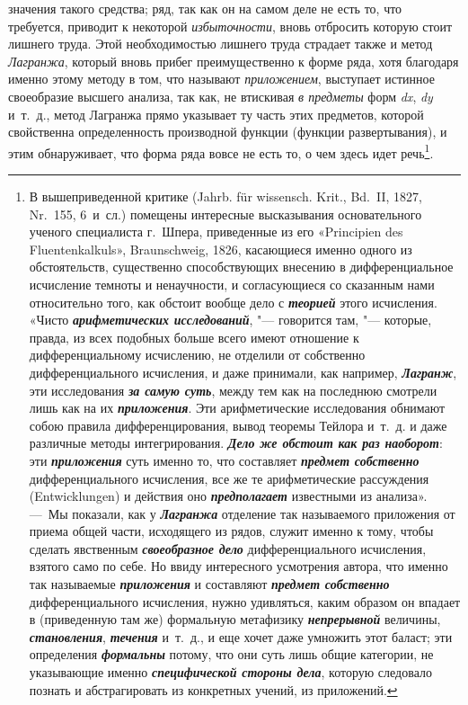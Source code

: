 значения такого средства; ряд, так как он на самом деле не есть то, что
требуется, приводит к некоторой {\em избыточности},
вновь отбросить которую стоит лишнего труда. Этой необходимостью лишнего
труда страдает также и метод {\em Лагранжа}, который
вновь прибег преимущественно к форме ряда, хотя благодаря именно этому
методу в том, что называют {\em приложением}, выступает
истинное своеобразие высшего анализа, так как, не втискивая
{\em в предметы} форм {\em dx},
{\em dy} и~т.~д., метод Лагранжа прямо указывает ту
часть этих предметов, которой свойственна определенность производной
функции (функции развертывания), и этим обнаруживает, что форма ряда вовсе
не есть то, о чем здесь идет речь\footnote{В вышеприведенной
критике (Jahrb. für wissensch. Krit., Bd.~II, 1827, Nr.~155, 6~и~сл.)
помещены интересные высказывания основательного ученого специалиста
г.~Шпера, приведенные из его «Principien des Fluentenkalkuls», Braunschweig,
1826, касающиеся именно одного из обстоятельств, существенно способствующих
внесению в дифференциальное исчисление темноты и ненаучности, и
согласующиеся со сказанным нами относительно того, как обстоит вообще дело
с {\em\bfseries теорией} этого исчисления.
«Чисто {\em\bfseries арифметических исследований},
"--- говорится там, "--- которые, правда, из всех
подобных больше всего имеют отношение к дифференциальному исчислению, не
отделили от собственно дифференциального исчисления, и даже принимали, как
например, {\em\bfseries Лагранж}, эти
исследования {\em\bfseries за самую суть},
между тем как на последнюю смотрели лишь как на их
{\em\bfseries приложения}. Эти
арифметические исследования обнимают собою правила дифференцирования, вывод
теоремы Тейлора и~т.~д. и даже различные методы интегрирования.
{\em\bfseries Дело же обстоит как раз наоборот}: эти {\em\bfseries приложения}
суть именно то, что составляет {\em\bfseries предмет собственно}
дифференциального исчисления, все же те арифметические
рассуждения (Entwicklungen) и действия оно
{\em\bfseries предполагает} известными из анализа». ---~Мы показали, как у
{\em\bfseries Лагранжа} отделение так
называемого приложения от приема общей части, исходящего из рядов, служит
именно к тому, чтобы сделать явственным
{\em\bfseries своеобразное дело}
дифференциального исчисления, взятого само по себе. Но ввиду
интересного усмотрения автора, что именно так называемые
{\em\bfseries приложения} и составляют
{\em\bfseries предмет собственно}
дифференциального исчисления, нужно удивляться, каким образом
он впадает в (приведенную там же) формальную метафизику
{\em\bfseries непрерывной} величины,
{\em\bfseries становления},
{\em\bfseries течения} и~т.~д., и еще хочет
даже умножить этот баласт; эти определения
{\em\bfseries формальны} потому, что они
суть лишь общие категории, не указывающие именно
{\em\bfseries специфической стороны дела},
которую следовало познать и абстрагировать из конкретных
учений, из приложений.}.


